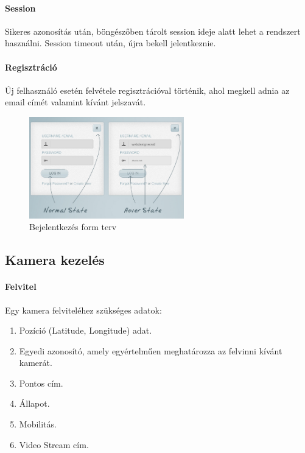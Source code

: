   
  \paragraph{Session} Sikeres azonosítás után, böngészőben tárolt session ideje alatt lehet a rendszert használni. Session timeout után, újra bekell jelentkeznie.
  
  
  \paragraph{Regisztráció} Új felhasználó esetén felvétele regisztrációval történik, ahol megkell adnia az email címét valamint kívánt jelszavát.
  
  \begin{figure}[h!]
    \centering
    \includegraphics[width=0.6\textwidth]{chapters/chap2/login_sketch.jpg}
    \caption{Bejelentkezés form terv}
  \end{figure}


\subsection{Kamera kezelés} %
\label{sub:kamerák_kezelése}

  \paragraph{Felvitel} Egy kamera felviteléhez szükséges adatok:
  \begin{enumerate}
    \item Pozíció (Latitude, Longitude) adat.
    \item Egyedi azonosító, amely egyértelműen meghatározza az felvinni kívánt kamerát.
    \item Pontos cím.
    \item Állapot.
    \item Mobilitás.
    \item Video Stream cím.
  \end{enumerate}
  
